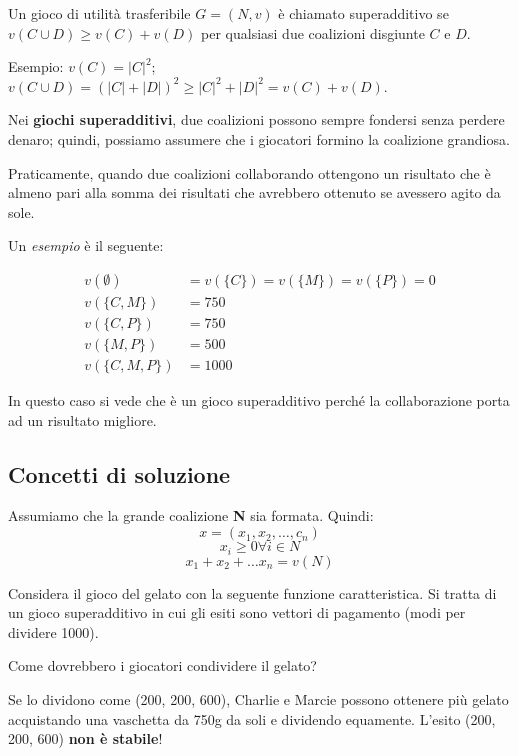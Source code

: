 \begin{definition}
    Un gioco di utilità trasferibile $G = (N, v)$ è chiamato superadditivo se $v(C \cup D) \geq v(C) + v(D)$ per qualsiasi due coalizioni disgiunte $C$ e $D$.

    Esempio: $v(C) = |C|^2$; $v(C \cup D) = (|C| + |D|)^2 \geq |C|^2 + |D|^2 = v(C)
        + v(D)$.

    Nei \textbf{giochi superadditivi}, due coalizioni possono sempre fondersi senza
    perdere denaro; quindi, possiamo assumere che i giocatori formino la coalizione
    grandiosa.

    Praticamente, quando due coalizioni collaborando ottengono un risultato che è
    almeno pari alla somma dei risultati che avrebbero ottenuto se avessero agito
    da sole.

    Un \textit{esempio} è il seguente:

    \begin{align*}
        v(\emptyset)   & = v(\{C\}) = v(\{M\}) = v(\{P\}) = 0 \\
        v(\{C, M\})    & = 750                                \\
        v(\{C, P\})    & = 750                                \\
        v(\{M, P\})    & = 500                                \\
        v(\{C, M, P\}) & = 1000
    \end{align*}

    In questo caso si vede che è un gioco superadditivo perché la collaborazione
    porta ad un risultato migliore.
\end{definition}

\subsection{Concetti di soluzione}

Assumiamo che la grande coalizione \textbf{N} sia formata. Quindi:
\[x = (x_1, x_2, \dots, c_n)\]
\[x_i \geq 0 \forall i \in N\]
\[x_1 + x_2 + \dots x_n = v(N)\]

Considera il gioco del gelato con la seguente funzione caratteristica. Si
tratta di un gioco superadditivo in cui gli esiti sono vettori di pagamento
(modi per dividere 1000).

Come dovrebbero i giocatori condividere il gelato?

Se lo dividono come (200, 200, 600), Charlie e Marcie possono ottenere più
gelato acquistando una vaschetta da 750g da soli e dividendo equamente. L'esito
(200, 200, 600) \textbf{non è stabile}!

